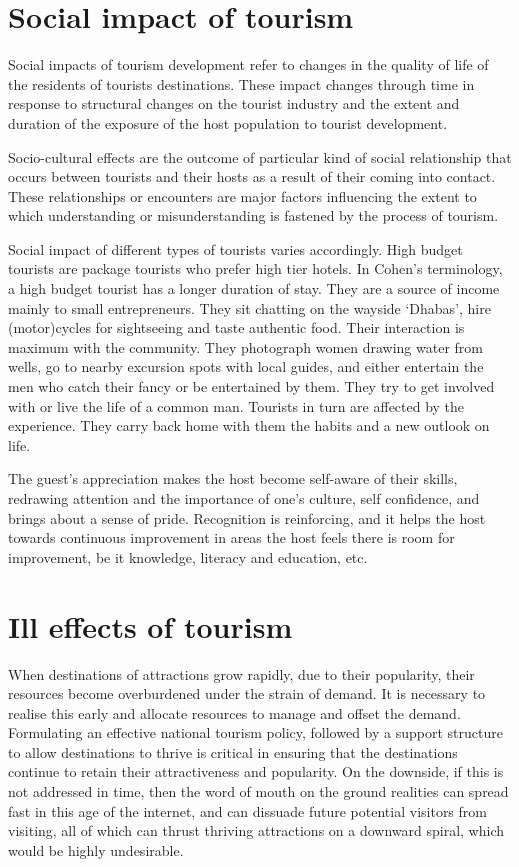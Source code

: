 
\section{Social impact of tourism} %
\label{sec:simt}

Social impacts of tourism development refer to changes in the quality of life of the residents of tourists destinations. These impact changes through time in response to structural changes on the tourist industry and the extent and duration of the exposure of the host population to tourist development.

Socio-cultural effects are the outcome of particular kind of social relationship that occurs between tourists and their hosts as a result of their coming into contact. These relationships or encounters are major factors influencing the extent to which understanding or misunderstanding is fastened by the process of tourism.

Social impact of different types of tourists varies accordingly. High budget tourists are package tourists who prefer high tier hotels. In Cohen's terminology, a high budget tourist has a longer duration of stay. They are a source of income mainly to small entrepreneurs. They sit chatting on the wayside `Dhabas', hire (motor)cycles for sightseeing and taste authentic food. Their interaction is maximum with the community. They photograph women drawing water from wells, go to nearby excursion spots with local guides, and either entertain the men who catch their fancy or be entertained by them. They try to get involved with or live the life of a common man. Tourists in turn are affected by the experience. They carry back home with them the habits and a new outlook on life.

The guest's appreciation makes the host become self-aware of their skills, redrawing attention and the importance of one's culture, self confidence, and brings about a sense of pride. Recognition is reinforcing, and it helps the host towards continuous improvement in areas the host feels there is room for improvement, be it knowledge, literacy and education, etc.


\section{Ill effects of tourism} %
\label{sec:iet}

When destinations of attractions grow rapidly, due to their popularity, their resources become overburdened under the strain of demand. It is necessary to realise this early and allocate resources to manage and offset the demand. Formulating an effective national tourism policy, followed by a support structure to allow destinations to thrive is critical in ensuring that the destinations continue to retain their attractiveness and popularity. On the downside, if this is not addressed in time, then the word of mouth on the ground realities can spread fast in this age of the internet, and can dissuade future potential visitors from visiting, all of which can thrust thriving attractions on a downward spiral, which would be highly undesirable.


